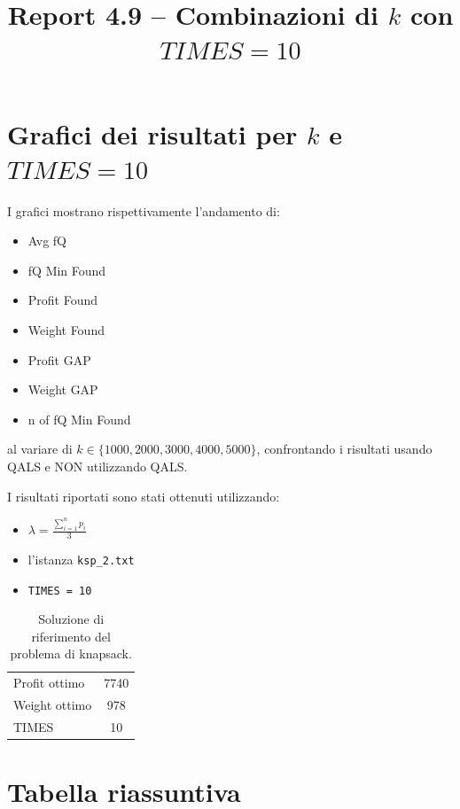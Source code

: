 \documentclass[a4paper,12pt]{article}
\title{Report 4.9 -- Combinazioni di $k$ con $TIMES = 10$}
\begin{document}
\maketitle

\newpage

\section{Grafici dei risultati per $k$ e $TIMES = 10$}

I grafici mostrano rispettivamente l'andamento di:
\begin{itemize}
    \item Avg fQ
    \item fQ Min Found
    \item Profit Found
    \item Weight Found
    \item Profit GAP
    \item Weight GAP
    \item n of fQ Min Found
\end{itemize}
al variare di $k \in \{1000, 2000, 3000, 4000, 5000\}$, confrontando
i risultati usando QALS e NON utilizzando QALS.

I risultati riportati sono stati ottenuti utilizzando:

\begin{itemize}
    \item $\lambda = \frac{\sum_{i=1}^{n} p_i}{3}$
    \item l'istanza \texttt{ksp\_2.txt}
    \item \texttt{TIMES = 10}
\end{itemize}

\begin{table}[H]
\centering
\begin{tabular}{lc}
\toprule
Profit ottimo & 7740 \\
Weight ottimo & 978 \\
TIMES & 10 \\
\bottomrule
\end{tabular}
\caption{Soluzione di riferimento del problema di knapsack.}
\end{table}

\section{Tabella riassuntiva}
\end{document}
